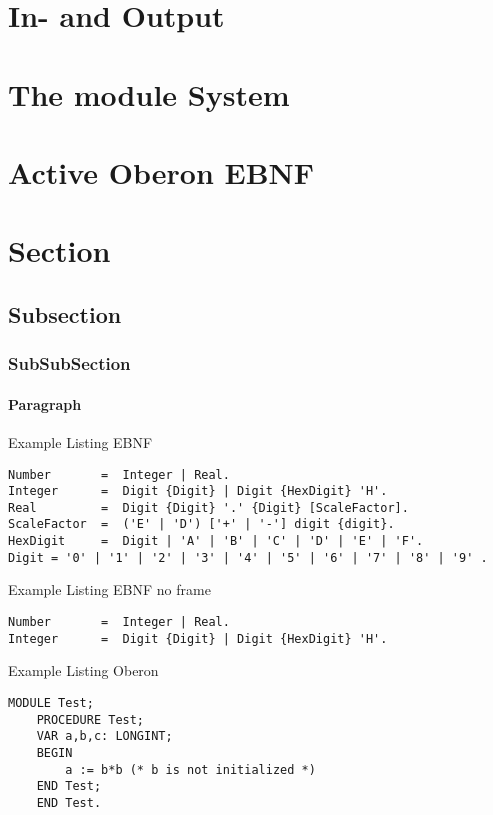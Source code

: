 \documentclass[a4paper,11pt]{article}
\begin{document}
\section{In- and Output}

\section{The module System}

\section{Active Oberon EBNF}



\section{Section}
\subsection{Subsection}
\subsubsection{SubSubSection}
\paragraph{Paragraph}

Example Listing EBNF
\begin{lstlisting}[language=ebnf]
Number       =  Integer | Real.
Integer      =  Digit {Digit} | Digit {HexDigit} 'H'.
Real         =  Digit {Digit} '.' {Digit} [ScaleFactor].
ScaleFactor  =  ('E' | 'D') ['+' | '-'] digit {digit}.
HexDigit     =  Digit | 'A' | 'B' | 'C' | 'D' | 'E' | 'F'.
Digit = '0' | '1' | '2' | '3' | '4' | '5' | '6' | '7' | '8' | '9' .
\end{lstlisting}

Example Listing EBNF no frame
\begin{lstlisting}[language=ebnf,frame=none]
Number       =  Integer | Real.
Integer      =  Digit {Digit} | Digit {HexDigit} 'H'.
\end{lstlisting}


Example Listing Oberon
\begin{lstlisting}[language=Oberon]
    MODULE Test;
    PROCEDURE Test;
    VAR a,b,c: LONGINT;
    BEGIN
        a := b*b (* b is not initialized *)
    END Test;
    END Test.
\end{lstlisting}
\end{document}
